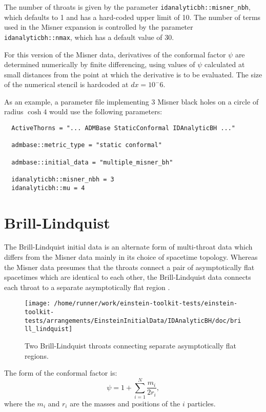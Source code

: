 \documentclass{article}
\begin{document}
The number of throats is given by the parameter
\texttt{idanalyticbh::misner\_nbh}, which defaults to 1 and has a
hard-coded upper limit of 10. The number of terms used in the Misner
expansion is controlled by the parameter
\texttt{idanalyticbh::nmax}, which has a default value of 30.

For this version of the Misner data, derivatives of the conformal
factor $\psi$ are determined numerically by finite differencing,
using values of $\psi$ calculated at small distances from the point at
which the derivative is to be evaluated. The size of the numerical
stencil is hardcoded at $dx=10^-6$.

As an example, a parameter file implementing 3 Misner black holes on a
circle of radius $\cosh 4$ would use the following parameters:
\begin{verbatim}
  ActiveThorns = "... ADMBase StaticConformal IDAnalyticBH ..."

  admbase::metric_type = "static conformal"

  admbase::initial_data = "multiple_misner_bh"

  idanalyticbh::misner_nbh = 3
  idanalyticbh::mu = 4
\end{verbatim}


\section{Brill-Lindquist}

The Brill-Lindquist initial data is an alternate form of multi-throat
data which differs from the Misner data mainly in its choice of
spacetime topology. Whereas the Misner data presumes that the throats
connect a pair of asymptotically flat spacetimes which are identical
to each other, the Brill-Lindquist data connects each throat to a
separate asymptotically flat region \cite{CactusEinstein_IDAnalyticBH_brill-lindquist:1963}.
\begin{figure}
  \centering
  \texttt{[image: /home/runner/work/einstein-toolkit-tests/einstein-toolkit-tests/arrangements/EinsteinInitialData/IDAnalyticBH/doc/brill\_lindquist]}
  \caption{Two Brill-Lindquist throats connecting separate
    asymptotically flat regions.}
\end{figure}
The form of the conformal factor is:
\begin{equation}
  \psi = 1 + \sum_{i=1}^N \frac{m_i}{2r_i},
\end{equation}
where the $m_i$ and $r_i$ are the masses and positions of the $i$
particles.
\end{document}

